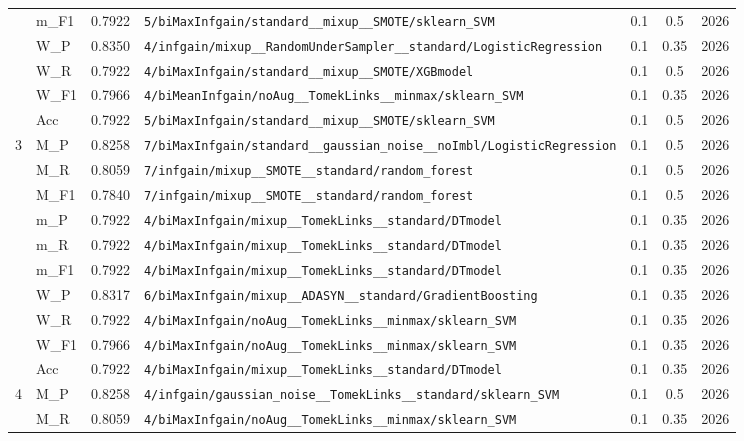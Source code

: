 \begin{table}[htbp]
\begin{tabular}{|c|l|c|>{\ttfamily\footnotesize}p{7.2cm}|c|c|c|}
 & m\_F1 & 0.7922 & \texttt{5/biMaxInfgain/standard\_\_mixup\_\_SMOTE/sklearn\_SVM} & 0.1 & 0.5  & 2026 \\ 
 & W\_P & 0.8350 & \texttt{4/infgain/mixup\_\_RandomUnderSampler\_\_standard/LogisticRegression} & 0.1 & 0.35  & 2026 \\ 
 & W\_R & 0.7922 & \texttt{4/biMaxInfgain/standard\_\_mixup\_\_SMOTE/XGBmodel} & 0.1 & 0.5  & 2026 \\ 
 & W\_F1 & 0.7966 & \texttt{4/biMeanInfgain/noAug\_\_TomekLinks\_\_minmax/sklearn\_SVM} & 0.1 & 0.35  & 2026 \\ 
 & Acc & 0.7922 & \texttt{5/biMaxInfgain/standard\_\_mixup\_\_SMOTE/sklearn\_SVM} & 0.1 & 0.5  & 2026 \\ 
\hline
\multirow{10}{*}{3} & M\_P & 0.8258 & \texttt{7/biMaxInfgain/standard\_\_gaussian\_noise\_\_noImbl/LogisticRegression} & 0.1 & 0.5  & 2026 \\ 
 & M\_R & 0.8059 & \texttt{7/infgain/mixup\_\_SMOTE\_\_standard/random\_forest} & 0.1 & 0.5  & 2026 \\ 
 & M\_F1 & 0.7840 & \texttt{7/infgain/mixup\_\_SMOTE\_\_standard/random\_forest} & 0.1 & 0.5  & 2026 \\ 
 & m\_P & 0.7922 & \texttt{4/biMaxInfgain/mixup\_\_TomekLinks\_\_standard/DTmodel} & 0.1 & 0.35  & 2026 \\ 
 & m\_R & 0.7922 & \texttt{4/biMaxInfgain/mixup\_\_TomekLinks\_\_standard/DTmodel} & 0.1 & 0.35  & 2026 \\ 
 & m\_F1 & 0.7922 & \texttt{4/biMaxInfgain/mixup\_\_TomekLinks\_\_standard/DTmodel} & 0.1 & 0.35  & 2026 \\ 
 & W\_P & 0.8317 & \texttt{6/biMaxInfgain/mixup\_\_ADASYN\_\_standard/GradientBoosting} & 0.1 & 0.35  & 2026 \\ 
 & W\_R & 0.7922 & \texttt{4/biMaxInfgain/noAug\_\_TomekLinks\_\_minmax/sklearn\_SVM} & 0.1 & 0.35  & 2026 \\ 
 & W\_F1 & 0.7966 & \texttt{4/biMaxInfgain/noAug\_\_TomekLinks\_\_minmax/sklearn\_SVM} & 0.1 & 0.35  & 2026 \\ 
 & Acc & 0.7922 & \texttt{4/biMaxInfgain/mixup\_\_TomekLinks\_\_standard/DTmodel} & 0.1 & 0.35  & 2026 \\ 
\hline
\multirow{10}{*}{4} & M\_P & 0.8258 & \texttt{4/infgain/gaussian\_noise\_\_TomekLinks\_\_standard/sklearn\_SVM} & 0.1 & 0.5  & 2026 \\ 
 & M\_R & 0.8059 & \texttt{4/biMaxInfgain/noAug\_\_TomekLinks\_\_minmax/sklearn\_SVM} & 0.1 & 0.35  & 2026 \\ 

\end{tabular}
\end{table}
